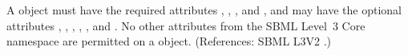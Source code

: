 A \Species object must have the required attributes ,
, ,
 and , and may have the optional
attributes , , ,
, , 
and .  No other attributes from the SBML Level~3
Core namespace are permitted on a \Species object.  (References: SBML L3V2
.)
